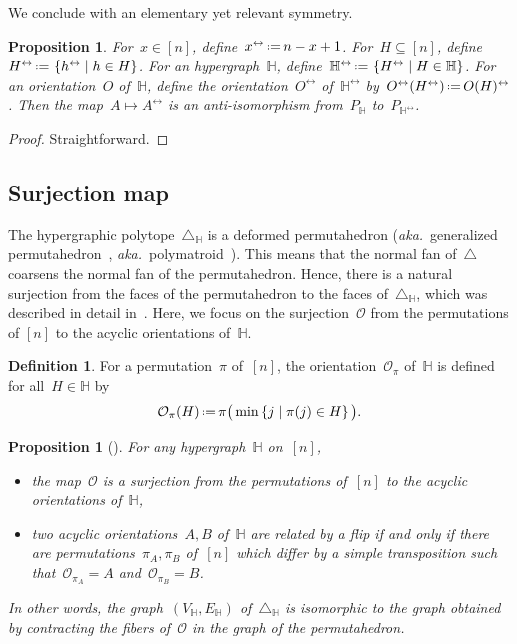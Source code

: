\documentclass{amsart}
\newtheorem{proposition}[theorem]{Proposition}
\theoremstyle{definition}
\newtheorem{definition}[theorem]{Definition}
\newcommand{\set}[2]{\left\{ #1 \;\middle|\; #2 \right\}} %
\newcommand{\eqdef}{\mbox{\,\raisebox{0.2ex}{\scriptsize\ensuremath{\mathrm:}}\ensuremath{=}\,}} %
\newcommand{\simplex}{\triangle} %
\newcommand{\aka}{\textit{aka.}~} %
\newcommand{\Or}{\mathcal O}  %
\newcommand{\HH}{\mathbb H}  %
\begin{document}
We conclude with an elementary yet relevant symmetry.

\begin{proposition}
\label{prop:antiIsomorphism}
For~$x \in [n]$, define~$x^\leftrightarrow \eqdef n-x+1$.
For~$H \subseteq [n]$, define~$H^\leftrightarrow \eqdef \set{h^\leftrightarrow}{h \in H}$.
For an hypergraph~$\HH$, define~$\HH^\leftrightarrow \eqdef \set{H^\leftrightarrow}{H \in \HH}$.
For an orientation~$O$ of~$\HH$, define the orientation~$O^\leftrightarrow$ of~$\HH^\leftrightarrow$ by~$O^\leftrightarrow(H^\leftrightarrow) \eqdef O(H)^\leftrightarrow$.
Then the map~$A \mapsto A^\leftrightarrow$ is an anti-isomorphism from~$P_\HH$ to~$P_{\HH^\leftrightarrow}$.
\end{proposition}

\begin{proof}
Straightforward.
\end{proof}


\subsection{Surjection map} 
\label{subsec:surjection}

The hypergraphic polytope~$\simplex_\HH$ is a deformed permutahedron (\aka generalized permutahedron~\cite{Postnikov, PostnikovReinerWilliams}, \aka polymatroid~\cite{Edmonds}).
This means that the normal fan of~$\simplex$ coarsens the normal fan of the permutahedron.
Hence, there is a natural surjection from the faces of the permutahedron to the faces of~$\simplex_\HH$, which was described in detail in~\cite[Lem.~2.9]{BenedettiBergeronMachacek}.
Here, we focus on the surjection~$\Or$ from the permutations of $[n]$ to the acyclic orientations of~$\HH$.

\begin{definition}
\label{def:surjection}
For a permutation~$\pi$ of~$[n]$, the orientation~$\Or_\pi$ of~$\HH$ is defined for all~$H \in \HH$ by
\[
\Or_\pi(H) \eqdef  \pi\big(\min\set{j}{\pi(j)\in H}\big).
\]
\end{definition}

\begin{proposition}[{\cite[Lem.~2.9]{BenedettiBergeronMachacek}}]
For any hypergraph~$\HH$ on~$[n]$,
\begin{itemize}
\item the map~$\Or$ is a surjection from the permutations of~$[n]$ to the acyclic orientations of~$\HH$,
\item two acyclic orientations~$A,B$ of~$\HH$ are related by a flip if and only if there are permutations~$\pi_A, \pi_B$ of~$[n]$ which differ by a simple transposition such that~$\Or_{\pi_A} = A$ and~$\Or_{\pi_B} = B$.
\end{itemize}
In other words, the graph~$(V_\HH, E_\HH)$ of~$\simplex_\HH$ is isomorphic to the graph obtained by contracting the fibers of~$\Or$ in the graph of the permutahedron.
\end{proposition}
\end{document}

